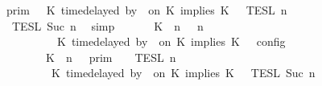 \begin{isabellebody}
\ \ \ \ \ \ \ \ \ {\isacharequal}\ {\isasymlbrakk}{\isasymlbrakk}\ {\isasymGamma}\ {\isasymrbrakk}{\isasymrbrakk}\isactrlsub p\isactrlsub r\isactrlsub i\isactrlsub m\ {\isasyminter}\ {\isasymlbrakk}{\isasymlbrakk}\ {\isacharparenleft}K\ time{\isacharminus}delayed\ by\ {\isasymdelta}{\isasymtau}\ on\ K\ implies\ K\ {\isacharhash}\ {\isasymPsi}\ {\isasymrbrakk}{\isasymrbrakk}\isactrlsub T\isactrlsub E\isactrlsub S\isactrlsub L\isactrlbsup {\isasymge}\ n\isactrlesup \isanewline
\ \ \ \ \ \ \ \ \ \ {\isasyminter}\ {\isasymlbrakk}{\isasymlbrakk}\ {\isasymPhi}\ {\isasymrbrakk}{\isasymrbrakk}\isactrlsub T\isactrlsub E\isactrlsub S\isactrlsub L\isactrlbsup {\isasymge}\ Suc\ n\isactrlesup {\isacartoucheclose}\ \isamarkupfalse%
\ simp\isanewline
\ \ \isamarkupfalse%
\ \isamarkupfalse%
\ {\isacartoucheopen}{\isasymlbrakk}\ {\isacharparenleft}{\isacharparenleft}K\ {\isasymnot}{\isasymUp}\ n{\isacharparenright}\ {\isacharhash}\ {\isasymGamma}{\isacharparenright}{\isacharcomma}\ n\isanewline
\ \ \ \ \ \ \ \ \ \ \ \ \ \ \ \ \ \ {\isasymturnstile}\ {\isasymPsi}\ {\isasymtriangleright}\ {\isacharparenleft}{\isacharparenleft}K\ time{\isacharminus}delayed\ by\ {\isasymdelta}{\isasymtau}\ on\ K\ implies\ K\ {\isacharhash}\ {\isasymPhi}{\isacharparenright}\ {\isasymrbrakk}\isactrlsub c\isactrlsub o\isactrlsub n\isactrlsub f\isactrlsub i\isactrlsub g\isanewline
\ \ \ \ \ \ \ \ \ \ \ \ \ \ \ \ \ {\isacharequal}\ {\isasymlbrakk}{\isasymlbrakk}\ {\isacharparenleft}K\ {\isasymnot}{\isasymUp}\ n{\isacharparenright}\ {\isacharhash}\ {\isasymGamma}\ {\isasymrbrakk}{\isasymrbrakk}\isactrlsub p\isactrlsub r\isactrlsub i\isactrlsub m\ {\isasyminter}\ {\isasymlbrakk}{\isasymlbrakk}\ {\isasymPsi}\ {\isasymrbrakk}{\isasymrbrakk}\isactrlsub T\isactrlsub E\isactrlsub S\isactrlsub L\isactrlbsup {\isasymge}\ n\isactrlesup \isanewline
\ \ \ \ \ \ \ \ \ \ \ \ \ \ \ \ \ \ {\isasyminter}\ {\isasymlbrakk}{\isasymlbrakk}\ {\isacharparenleft}K\ time{\isacharminus}delayed\ by\ {\isasymdelta}{\isasymtau}\ on\ K\ implies\ K\ {\isacharhash}\ {\isasymPhi}\ {\isasymrbrakk}{\isasymrbrakk}\isactrlsub T\isactrlsub E\isactrlsub S\isactrlsub L\isactrlbsup {\isasymge}\ Suc\ n\isactrlesup {\isacartoucheclose}\isanewline

\end{isabellebody}

